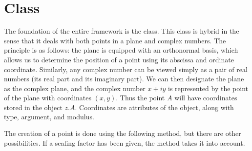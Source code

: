 \newpage

\section{Class } %
\label{sec:class_point}

The foundation of the entire framework is the  class. This class is hybrid in the sense that it deals with both points in a plane and complex numbers. The principle is as follows: the plane is equipped with an orthonormal basis, which allows us to determine the position of a point using its abscissa and ordinate coordinate. Similarly, any complex number can be viewed simply as a pair of real numbers (its real part and its imaginary part).  We can then designate the plane as the complex plane, and the complex number $x+iy$ is represented by the point of the plane with coordinates $(x,y)$. Thus the point $A$ will have coordinates stored in the object $z.A$. Coordinates are attributes of the  object,  along with type, argument, and modulus.



The creation of a point is done using the following method, but there are other possibilities. If a scaling factor has been given, the method takes it into account.

